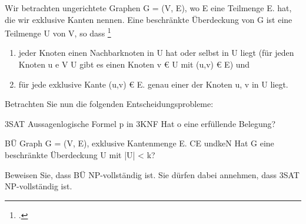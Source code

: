 \documentclass{bschlangaul-aufgabe}
\begin{document}

Wir betrachten ungerichtete Graphen G = (V, E), wo E eine Teilmenge E.
hat, die wir exklusive Kanten nennen. Eine beschränkte Überdeckung von G
ist eine Teilmenge U von V, so dass
\footcite{examen:66116:2018:09}

\begin{enumerate}
\item jeder Knoten einen Nachbarknoten in U hat oder selbst in U liegt
(für jeden Knoten u e V U gibt es einen Knoten v € U mit (u,v) € E) und

\item für jede exklusive Kante (u,v) € E. genau einer der Knoten u, v in
U liegt.

\end{enumerate}
Betrachten Sie nun die folgenden Entscheidungsprobleme:

\bProblemBeschreibung
{3SAT}
{Aussagenlogische Formel p in 3KNF}
{Hat o eine erfüllende Belegung?}

\bProblemBeschreibung
{BÜ}
{Graph G = (V, E), exklusive Kantenmenge E. CE
undkeN}
{Hat G eine beschränkte Überdeckung U mit |U| < k?}

Beweisen Sie, dass BÜ NP-vollständig ist. Sie dürfen dabei annehmen,
dass 3SAT NP-vollständig ist.
\end{document}
